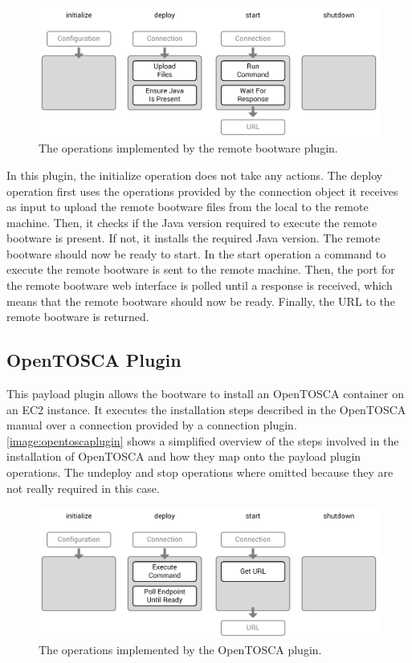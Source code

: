 \begin{figure}[!htbp]
	\centering
	\includegraphics[resolution=600]{implementation/assets/remotebootware_plugin}
	\caption{The operations implemented by the remote bootware plugin.}
	\label{image:remotebootwareplugin}
\end{figure}

In this plugin, the initialize operation does not take any actions.
The deploy operation first uses the operations provided by the connection object it receives as input to upload the remote bootware files from the local to the remote machine.
Then, it checks if the Java version required to execute the remote bootware is present.
If not, it installs the required Java version.
The remote bootware should now be ready to start.
In the start operation a command to execute the remote bootware is sent to the remote machine.
Then, the port for the remote bootware web interface is polled until a response is received, which means that the remote bootware should now be ready.
Finally, the URL to the remote bootware is returned.

\subsection{OpenTOSCA Plugin}

This payload plugin allows the bootware to install an OpenTOSCA container on an EC2 instance.
It executes the installation steps described in the OpenTOSCA manual over a connection provided by a connection plugin.
\autoref{image:opentoscaplugin} shows a simplified overview of the steps involved in the installation of OpenTOSCA and how they map onto the payload plugin operations.
The undeploy and stop operations where omitted because they are not really required in this case.

\begin{figure}[!htbp]
	\centering
	\includegraphics[resolution=600]{implementation/assets/opentosca_plugin}
	\caption{The operations implemented by the OpenTOSCA plugin.}
	\label{image:opentoscaplugin}
\end{figure}

